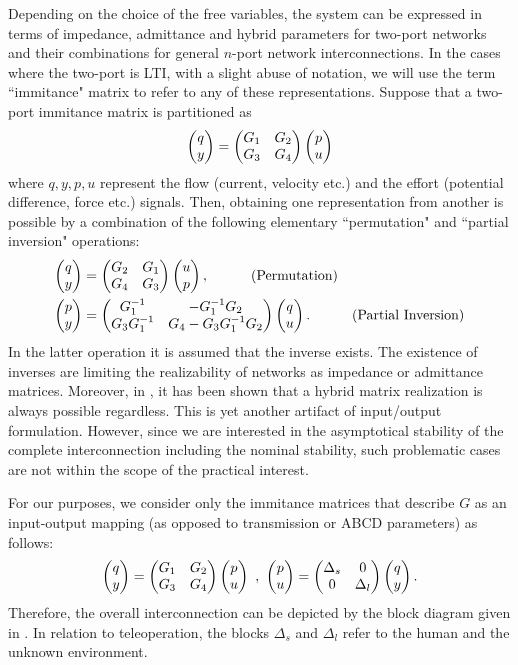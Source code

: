 Depending on the choice of the free variables, the system can be expressed in terms of impedance, admittance 
and hybrid parameters for two-port networks and their combinations for general $n$-port network interconnections. 
In the cases where the two-port is LTI, with a slight abuse of notation, we will use the term ``immitance" matrix to refer to 
any of these representations. Suppose that a two-port immitance matrix is partitioned as
\[
\begin{pmatrix}q\\y\end{pmatrix}=\begin{pmatrix}G_1 &G_2\\G_3 &G_4\end{pmatrix}\begin{pmatrix}p\\u\end{pmatrix}
\]
where $q,y,p,u$ represent the flow (current, velocity etc.) and the effort (potential difference, force etc.) signals. Then, 
obtaining one representation from another is possible by a combination of the following elementary ``permutation" and 
``{partial} inversion" operations:
\begin{align*}
\begin{pmatrix}q\\y\end{pmatrix}&=\begin{pmatrix}G_2 &G_1\\G_4 &G_3\end{pmatrix}\begin{pmatrix}u\\p\end{pmatrix}, \ \ \ \tag{Permutation}\\
\begin{pmatrix}p\\y\end{pmatrix}&=\begin{pmatrix}G_1^{-1} &-G_1^{-1}G_2\\G_3G_1^{-1} &G_4-G_3G_1^{-1}G_2\end{pmatrix}\begin{pmatrix}q\\u\end{pmatrix}. \ \ \ \tag{Partial Inversion}
\end{align*}
In the latter operation it is assumed that the inverse exists. The existence of inverses are limiting the realizability
of networks as impedance or admittance matrices. Moreover, in \cite{andersonHmat}, it has been shown that a hybrid matrix
realization is always possible regardless. This is yet another artifact of input/output formulation. However, since we are 
interested in the asymptotical stability of the complete interconnection including the nominal stability, such problematic 
cases are not within the scope of the practical interest. 



For our purposes, we consider only the immitance 
matrices that describe $G$ as an input-output mapping (as opposed to transmission or ABCD parameters) as {follows}:
\begin{equation}
\begin{pmatrix}q\\y\end{pmatrix}=\begin{pmatrix}G_1 &G_2\\G_3 &G_4\end{pmatrix}\begin{pmatrix}p\\u\end{pmatrix} \ , \ \begin{pmatrix}p\\u\end{pmatrix}=\begin{pmatrix}\Delta_s &0\\0&\Delta_l\end{pmatrix} \begin{pmatrix}q\\y\end{pmatrix}.
\end{equation}
Therefore, the overall interconnection can be {depicted} by the block diagram given in . 
In relation to teleoperation, the {blocks} $\Delta_s$ and $\Delta_l$ refer to the human and the unknown environment. 


